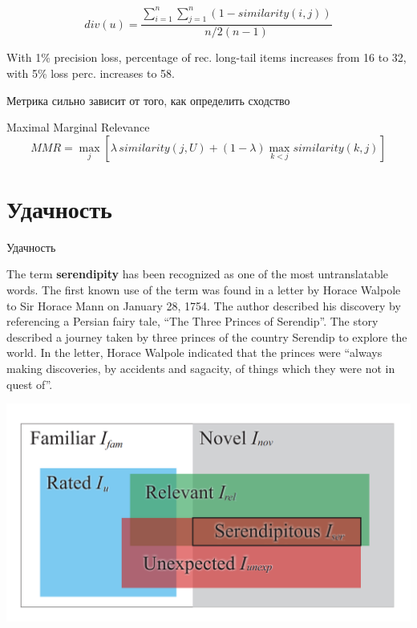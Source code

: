 \documentclass[11pt,aspectratio=169,handout]{beamer}
\begin{document}
\begin{frame}

\[
div(u) = \frac{\sum_{i=1}^n \sum_{j=1}^n (1 - similarity(i, j))}{n/2 (n-1)} 
\]

\vfill

\begin{tcolorbox}[colback=gray!5,colframe=gray!80,title=]
With 1\% precision loss, percentage of rec. long-tail items increases from 16 to 32, with 5\% loss perc. increases to 58.
\end{tcolorbox}

\vfill

\begin{tcolorbox}[colback=warn!5,colframe=warn!80,title=]
Метрика сильно зависит от того, как определить сходство
\end{tcolorbox}

\end{frame}

\begin{frame}
Maximal Marginal Relevance \cite{CARBONELL}
\[
MMR = \max_j \left[ \lambda \, similarity(j, U) + (1 - \lambda) \max_{k < j} similarity(k, j) \right]
\]
\end{frame}

\section{Удачность}

\begin{frame}{Удачность}

The term {\bf serendipity} has been recognized as one of the most untranslatable words. 
The first known use of the term was found in a letter by Horace Walpole to Sir Horace Mann on January 28, 1754. 
The author described his discovery by referencing a Persian fairy tale, ``The Three Princes of Serendip''. 
The story described a journey taken by three princes of the country Serendip to explore the world. 
In the letter, Horace Walpole indicated that the princes were ``always making discoveries, by accidents and sagacity, of things which they were not in quest of''. \cite{KOTKOV}

\begin{center}
\includegraphics[scale=0.3]{images/serendipity.png}
\end{center}

\end{frame}
\end{document}

